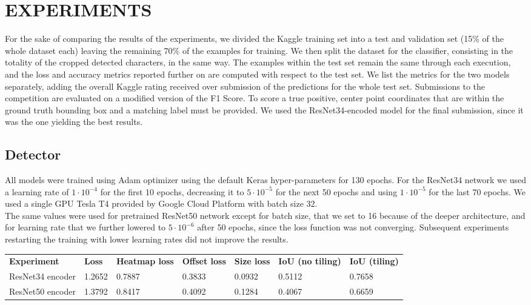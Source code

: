 \section{EXPERIMENTS}
\label{sec:experiments}

For the sake of comparing the results of the experiments, we divided the Kaggle training set into a test and validation set (15\% of the whole dataset each) leaving the remaining 70\% of the examples for training. We then split the dataset for the classifier, consisting in the totality of the cropped detected characters, in the same way. The examples within the test set remain the same through each execution, and the loss and accuracy metrics reported further on are computed with respect to the test set. We list the metrics for the two models separately, adding the overall Kaggle rating received over submission of the predictions for the whole test set. Submissions to the competition are evaluated on a modified version of the F1 Score. To score a true positive, center point coordinates that are within the ground truth bounding box and a matching label must be provided. We used the ResNet34-encoded model for the final submission, since it was the one yielding the best results.

\subsection{Detector}
\label{ssec:detectorexp}

All models were trained using Adam optimizer using the default Keras hyper-parameters for 130 epochs. For the ResNet34 network we used a learning rate of $1 \cdot 10^{-4}$ for the first 10 epochs, decreasing it to $5 \cdot 10^{-5}$ for the next 50 epochs and using $1 \cdot 10^{-5}$ for the last 70 epochs. We used a single GPU Tesla T4 provided by Google Cloud Platform with batch size 32.\\
The same values were used for pretrained ResNet50 network except for batch size, that we set to 16 because of the deeper architecture, and for learning rate that we further lowered to $5 \cdot 10^{-6}$ after 50 epochs, since the loss function was not converging. Subsequent experiments restarting the training with lower learning rates did not improve the results.

\begin{table*}[h]
	\begin{tabular}{lllllll}
		\rowcolor[HTML]{EFEFEF} 
		\textbf{Experiment}   & \textbf{Loss} & \textbf{Heatmap loss} & \textbf{Offset loss} & \textbf{Size loss} & \textbf{IoU (no tiling)} & \textbf{IoU (tiling)} \\
		ResNet34 encoder      & 1.2652        & 0.7887                & 0.3833               & 0.0932             & 0.5112                   & 0.7658                \\
		ResNet50 encoder      & 1.3792        & 0.8417                & 0.4092               & 0.1284             & 0.4067                   & 0.6659                   
	\end{tabular}
\end{table*}

